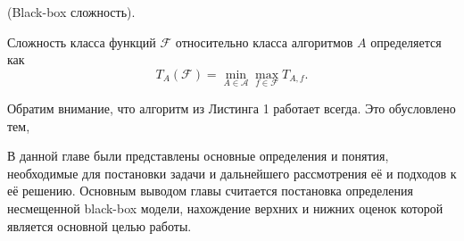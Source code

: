 \begin{definition}
(Black-box сложность). 

Сложность класса функций $\mathcal{F}$ относительно класса алгоритмов $A$ определяется как
$$T_{A}(\mathcal{F}) = \min_{A \in \mathcal{A}} \max_{f \in \mathcal{F}} T_{A, f}.$$
\end{definition}

Обратим внимание, что алгоритм из Листинга 1 работает всегда. Это обусловлено тем, 

\chapterconclusion
В данной главе были представлены основные определения и понятия, необходимые для постановки задачи и дальнейшего рассмотрения её и подходов к её решению. Основным выводом главы считается постановка 
определения несмещенной black-box модели, нахождение верхних и нижних оценок которой является основной целью работы.   
